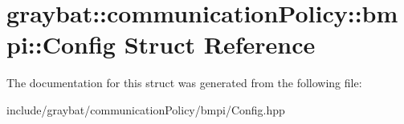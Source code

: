\hypertarget{structgraybat_1_1communicationPolicy_1_1bmpi_1_1Config}{}\section{graybat\+:\+:communication\+Policy\+:\+:bmpi\+:\+:Config Struct Reference}
\label{structgraybat_1_1communicationPolicy_1_1bmpi_1_1Config}


The documentation for this struct was generated from the following file\+:\begin{DoxyCompactItemize}
\item 
include/graybat/communication\+Policy/bmpi/Config.\+hpp\end{DoxyCompactItemize}
